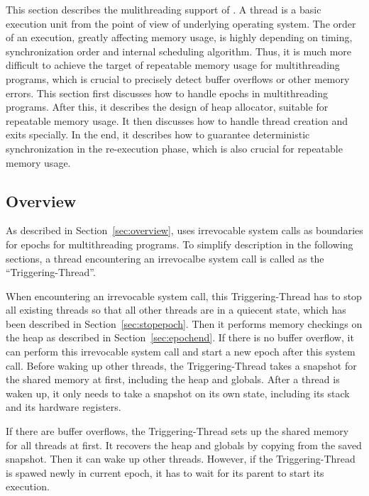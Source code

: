\label{sec:multithreading}

This section describes the mulithreading support of \doubletake{}.
A thread is a basic execution unit from the point of view of underlying operating system. 
The order of an execution, greatly affecting memory usage, 
is highly depending on timing, synchronization order and internal scheduling algorithm.   
Thus, it is much more difficult to achieve the target of repeatable memory 
usage for multithreading programs, which is crucial to 
precisely detect buffer overflows or other memory errors.
This section first discusses how to handle epochs in multithreading programs.
After this, it describes the design of heap allocator, suitable for repeatable memory usage.
It then discusses how to handle thread creation and exits specially. 
In the end, it describes how to guarantee deterministic synchronization in the re-execution phase,
which is also crucial for repeatable memory usage.


\subsection{Overview}
\label{sec:mtoverview}

As described in Section~\ref{sec:overview}, \doubletake{} uses irrevocable system calls as 
boundaries for epochs for multithreading programs. 
To simplify description in the following sections, a thread encountering an irrevocalbe system call is 
called as the ``Triggering-Thread''. 

When encountering an irrevocable system call, this Triggering-Thread 
has to stop all existing threads so that all other threads are in a quiecent state, which
has been described in Section~\ref{sec:stopepoch}.
Then it performs memory checkings on the heap as described in Section~\ref{sec:epochend}. 
If there is no buffer overflow, it can perform this irrevocable system call and 
start a new epoch after this system call. 
Before waking up other threads, the Triggering-Thread takes a snapshot for the shared memory at first,
including the heap and globals. 
After a thread is waken up, it only needs to take a snapshot on its own state, 
including its stack and its hardware registers. 

If there are buffer overflows, the Triggering-Thread sets up the shared memory 
for all threads at first.
It recovers the heap and globals by copying from the saved snapshot. 
Then it can wake up other threads. 
However, if the Triggering-Thread is spawed newly in current epoch, 
it has to wait for its parent to start its execution. 

